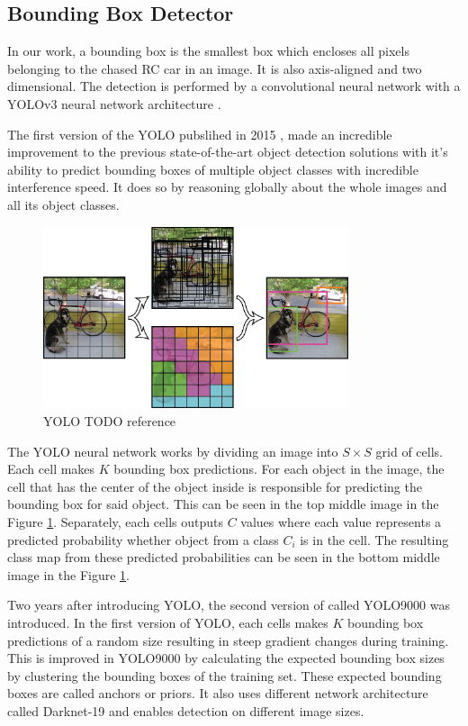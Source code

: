 \subsection{Bounding Box Detector}
In our work, a bounding box is the smallest box which encloses all pixels belonging to the chased RC car in an image. It is also axis-aligned and two dimensional. The detection is performed by a convolutional neural network \cite{CNN_Lecun} with a YOLOv3 neural network architecture \cite{YOLOv3}. \par 
The first version of the YOLO pubslihed in 2015 \cite{YOLO}, made an incredible improvement to the previous state-of-the-art object detection solutions with it's ability to predict bounding boxes of multiple object classes with incredible interference speed. It does so by reasoning globally about the whole images and all its object classes. \par
\begin{figure}[h!]
    \centering
    \includegraphics[width=0.8\textwidth]{images/YOLO.png}
    
    \caption{YOLO TODO reference}\label{f:YOLO}
\end{figure}

The YOLO neural network works by dividing an image into $S\times S$ grid of cells. Each cell makes $K$ bounding box predictions. For each object in the image, the cell that has the center of the object inside is responsible for predicting the bounding box for said object. This can be seen in the top middle image in the Figure \ref{f:YOLO}. Separately, each cells outputs $C$ values where each value represents a predicted probability whether object from a class $C_i$ is in the cell. The resulting class map from these predicted probabilities can be seen in the bottom middle image in the Figure \ref{f:YOLO}. 
\par
Two years after introducing YOLO, the second version of called YOLO9000 \cite{YOLO9000} was introduced.  In the first version of YOLO, each cells makes $K$ bounding box predictions of a random size resulting in steep gradient changes during training. %
This is improved in YOLO9000 by calculating the expected bounding box sizes by clustering the bounding boxes of the training set. These expected bounding boxes are called anchors or priors. It also uses different network architecture called Darknet-19 and enables detection on different image sizes. \par

